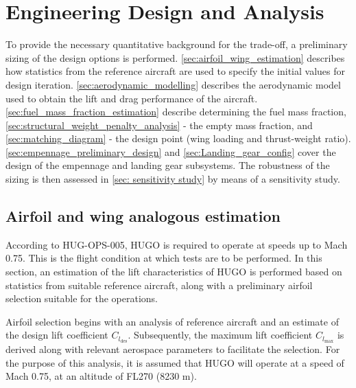 \chapter{Engineering Design and Analysis}
\label{ch:engineering_design}
To provide the necessary quantitative background for the trade-off, a preliminary sizing of the design options is performed. \autoref{sec:airfoil_wing_estimation} describes how statistics from the reference aircraft are used to specify the initial values for design iteration. \autoref{sec:aerodynamic_modelling} describes the aerodynamic model used to obtain the lift and drag performance of the aircraft. \autoref{sec:fuel_mass_fraction_estimation} describe determining the fuel mass fraction, \autoref{sec:structural_weight_penalty_analysis} - the empty mass fraction, and \autoref{sec:matching_diagram} - the design point (wing loading and thrust-weight ratio). \autoref{sec:empennage_preliminary_design} and \autoref{sec:Landing_gear_config} cover the design of the empennage and landing gear subsystems. The robustness of the sizing is then assessed in \autoref{sec: sensitivity study} by means of a sensitivity study.

\section{Airfoil and wing analogous estimation}
\label{sec:airfoil_wing_estimation}
According to HUG-OPS-005, HUGO is required to operate at speeds up to Mach 0.75. This is the flight condition at which tests are to be performed. In this section, an estimation of the lift characteristics of HUGO is performed based on statistics from suitable reference aircraft, along with a preliminary airfoil selection suitable for the operations.

Airfoil selection begins with an analysis of reference aircraft and an estimate of the design lift coefficient $C_{l_\text{des}}$. Subsequently, the maximum lift coefficient $C_{l_{\text{max}}}$ is derived along with relevant aerospace parameters to facilitate the selection. For the purpose of this analysis, it is assumed that HUGO will operate at a speed of Mach 0.75, at an altitude of FL270 (8230 m). 

